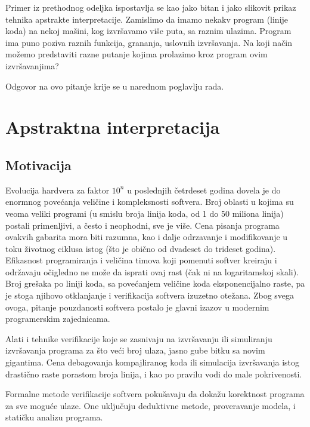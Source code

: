 \documentclass[a4paper]{article}
\begin{document}
Primer iz prethodnog odeljka ispostavlja se kao jako bitan i jako slikovit prikaz tehnika apstrakte interpretacije. Zamislimo da imamo nekakv program (linije koda) na nekoj mašini, kog izvršavamo više puta, sa raznim ulazima. Program ima puno poziva raznih funkcija, grananja, uslovnih izvršavanja. Na koji način možemo predstaviti razne putanje kojima prolazimo kroz program ovim izvršavanjima? \newline

Odgovor na ovo pitanje krije se u narednom poglavlju rada.

\section{Apstraktna interpretacija}

\subsection{Motivacija}

Evolucija hardvera za faktor $10^n$ u poslednjih četrdeset godina dovela je do enormnog povećanja veličine i kompleksnosti softvera. Broj oblasti u kojima su veoma veliki programi (u smislu broja linija koda, od 1 do 50 miliona linija) postali primenljivi, a često i neophodni, sve je više. Cena pisanja programa ovakvih gabarita mora biti razumna, kao i dalje odrzavanje i modifikovanje u toku životnog ciklusa istog (što je obično od dvadeset do trideset godina). Efikasnost programiranja i veličina timova koji pomenuti softver kreiraju i održavaju očigledno ne može da isprati ovaj rast (čak ni na logaritamskoj skali). Broj grešaka po liniji koda, sa povećanjem veličine koda eksponencijalno raste, pa je stoga njihovo otklanjanje i verifikacija softvera izuzetno otežana. Zbog svega ovoga, pitanje pouzdanosti softvera postalo je glavni izazov u modernim programerskim zajednicama. \newline

Alati i tehnike verifikacije koje se zasnivaju na izvršavanju ili simuliranju izvršavanja programa za što veći broj ulaza, jasno gube bitku sa novim gigantima. Cena debagovanja kompajliranog koda ili simulacija izvršavanja istog drastično raste porastom broja linija, i kao po pravilu vodi do male pokrivenosti. \newline

Formalne metode verifikacije softvera pokušavaju da dokažu korektnost programa za sve moguće ulaze. One uključuju deduktivne metode, proveravanje modela, i statičku analizu programa. \newline
\end{document}
